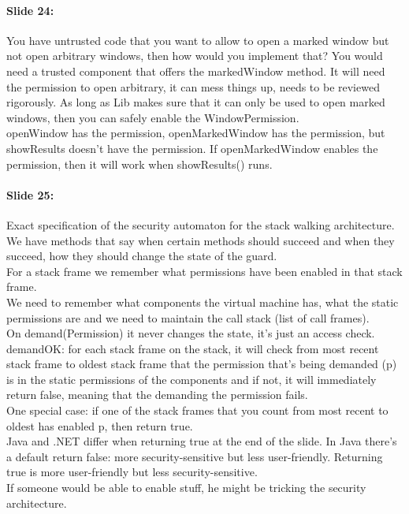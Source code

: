 \documentclass[10pt,a4paper]{report}
\begin{document}
\paragraph{Slide 24:} You have untrusted code that you want to allow to open a marked window but not open arbitrary windows, then how would you implement that? You would need a trusted component that offers the markedWindow method. It will need the permission to open arbitrary, it can mess things up, needs to be reviewed rigorously. As long as Lib makes sure that it can only be used to open marked windows, then you can safely enable the WindowPermission.\\
openWindow has the permission, openMarkedWindow has the permission, but showResults doesn't have the permission. If openMarkedWindow enables the permission, then it will work when showResults() runs. 

\paragraph{Slide 25:} Exact specification of the security automaton for the stack walking architecture. We have methods that say when certain methods should succeed and when they succeed, how they should change the state of the guard.\\
For a stack frame we remember what permissions have been enabled in that stack frame.\\
We need to remember what components the virtual machine has, what the static permissions are and we need to maintain the call stack (list of call frames).\\

On demand(Permission) it never changes the state, it's just an access check. \\
demandOK: for each stack frame on the stack, it will check from most recent stack frame to oldest stack frame that the permission that's being demanded (p) is in the static permissions of the components and if not, it will immediately return false, meaning that the demanding the permission fails. \\
One special case: if one of the stack frames that you count from most recent to oldest has enabled p, then return true.\\
Java and .NET differ when returning true at the end of the slide. In Java there's a default return false: more security-sensitive but less user-friendly. Returning true is more user-friendly but less security-sensitive.\\
If someone would be able to enable stuff, he might be tricking the security architecture.
\end{document}
